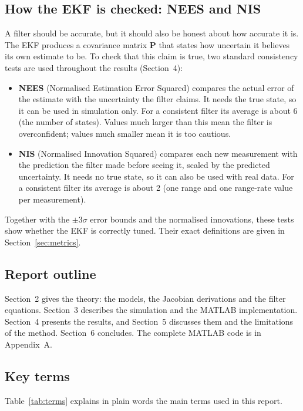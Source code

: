 \documentclass[11pt,a4paper]{article}
\newcommand{\bP}{\mathbf{P}}
\begin{document}
\subsection{How the EKF is checked: NEES and NIS}
\label{sec:checks}
A filter should be accurate, but it should also be honest about how accurate it is. The EKF produces a covariance matrix $\bP$ that states how uncertain it believes its own estimate to be. To check that this claim is true, two standard consistency tests are used throughout the results (Section~4):
\begin{itemize}
  \item \textbf{NEES} (Normalised Estimation Error Squared) compares the actual error of the estimate with the uncertainty the filter claims. It needs the true state, so it can be used in simulation only. For a consistent filter its average is about 6 (the number of states). Values much larger than this mean the filter is overconfident; values much smaller mean it is too cautious.
  \item \textbf{NIS} (Normalised Innovation Squared) compares each new measurement with the prediction the filter made before seeing it, scaled by the predicted uncertainty. It needs no true state, so it can also be used with real data. For a consistent filter its average is about 2 (one range and one range-rate value per measurement).
\end{itemize}
Together with the $\pm3\sigma$ error bounds and the normalised innovations, these tests show whether the EKF is correctly tuned. Their exact definitions are given in Section~\ref{sec:metrics}.

\subsection{Report outline}
Section~2 gives the theory: the models, the Jacobian derivations and the filter equations.
Section~3 describes the simulation and the MATLAB implementation.
Section~4 presents the results, and Section~5 discusses them and the limitations of the method.
Section~6 concludes. The complete MATLAB code is in Appendix~A.

\subsection{Key terms}
Table~\ref{tab:terms} explains in plain words the main terms used in this report.
\end{document}
